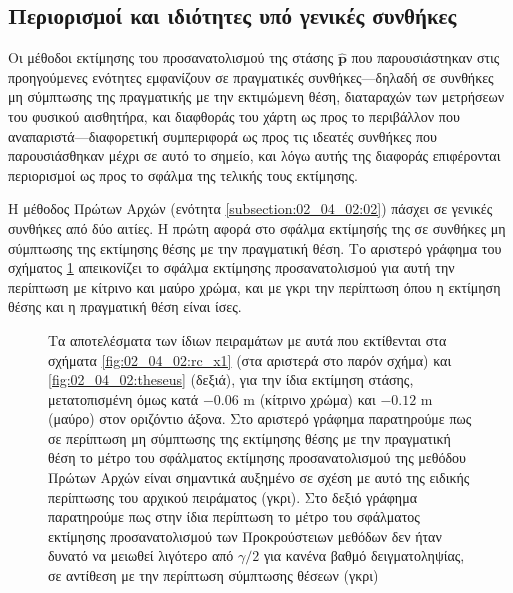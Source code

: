 \subsection{Περιορισμοί και ιδιότητες υπό γενικές συνθήκες}
\label{subsection:02_04_02:07}

Οι μέθοδοι εκτίμησης του προσανατολισμού της στάσης $\hat{\bm{p}}$ που
παρουσιάστηκαν στις προηγούμενες ενότητες εμφανίζουν σε πραγματικές
συνθήκες---δηλαδή σε συνθήκες μη σύμπτωσης της πραγματικής με την εκτιμώμενη
θέση, διαταραχών των μετρήσεων του φυσικού αισθητήρα, και διαφθοράς του χάρτη
ως προς το περιβάλλον που αναπαριστά---διαφορετική συμπεριφορά ως προς τις
ιδεατές συνθήκες που παρουσιάσθηκαν μέχρι σε αυτό το σημείο, και λόγω αυτής
της διαφοράς επιφέρονται περιορισμοί ως προς το σφάλμα της τελικής τους
εκτίμησης.

Η μέθοδος Πρώτων Αρχών (ενότητα \ref{subsection:02_04_02:02}) πάσχει σε γενικές
συνθήκες από δύο αιτίες. Η πρώτη αφορά στο σφάλμα εκτίμησής της σε συνθήκες μη
σύμπτωσης της εκτίμησης θέσης με την πραγματική θέση. Το αριστερό γράφημα του
σχήματος \ref{fig:02_04_02:skg_fmt_non_convergence} απεικονίζει το σφάλμα
εκτίμησης προσανατολισμού για αυτή την περίπτωση με κίτρινο και μαύρο χρώμα, και
με γκρι την περίπτωση όπου η εκτίμηση θέσης και η πραγματική θέση είναι ίσες.

\begin{figure}[!h]\centering
  \vspace{2cm}
  
  \vspace{1cm}
  \caption{\small Τα αποτελέσματα των ίδιων πειραμάτων με αυτά που εκτίθενται
           στα σχήματα \ref{fig:02_04_02:rc_x1} (στα αριστερά στο παρόν σχήμα)
           και \ref{fig:02_04_02:theseus} (δεξιά), για την ίδια εκτίμηση στάσης,
           μετατοπισμένη όμως κατά $-0.06$ m (κίτρινο χρώμα) και $-0.12$ m
           (μαύρο) στον οριζόντιο άξονα. Στο αριστερό γράφημα παρατηρούμε πως
           σε περίπτωση μη σύμπτωσης της εκτίμησης θέσης με την πραγματική θέση
           το μέτρο του σφάλματος εκτίμησης προσανατολισμού της μεθόδου Πρώτων
           Αρχών είναι σημαντικά αυξημένο σε σχέση με αυτό της ειδικής
           περίπτωσης του αρχικού πειράματος (γκρι). Στο δεξιό γράφημα
           παρατηρούμε πως στην ίδια περίπτωση το μέτρο του σφάλματος
           εκτίμησης προσανατολισμού των Προκρούστειων μεθόδων δεν ήταν δυνατό
           να μειωθεί λιγότερο από $\gamma/2$ για κανένα βαθμό δειγματοληψίας,
           σε αντίθεση με την περίπτωση σύμπτωσης θέσεων (γκρι)}
  \label{fig:02_04_02:skg_fmt_non_convergence}
\end{figure}

